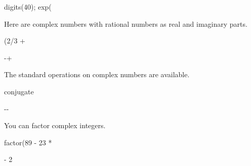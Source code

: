 {{{{{{{{\begin{xtc}
\begin{spadsrc}
digits(40);  exp(%
\end{spadsrc}
\begin{TeXOutput}
\begin{fricasmath}{13}
%
\end{fricasmath}
\end{TeXOutput}
\end{xtc}
\begin{xtc}
\begin{xtccomment}
Here are complex numbers with rational numbers as real and
imaginary parts.
\end{xtccomment}
\begin{spadsrc}
(2/3 + %
\end{spadsrc}
\begin{TeXOutput}
\begin{fricasmath}{14}
-{}+\TIMES \ImaginaryI %
\end{fricasmath}
\end{TeXOutput}
\end{xtc}
\begin{xtc}
\begin{xtccomment}
The standard operations on complex numbers are available.
\end{xtccomment}
\begin{spadsrc}
conjugate %
\end{spadsrc}
\begin{TeXOutput}
\begin{fricasmath}{15}
-{}-{\TIMES \ImaginaryI }%
\end{fricasmath}
\end{TeXOutput}
\end{xtc}
\begin{xtc}
\begin{xtccomment}
You can factor complex integers.
\end{xtccomment}
\begin{spadsrc}
factor(89 - 23 * %
\end{spadsrc}
\begin{TeXOutput}
\begin{fricasmath}{16}
-{\TIMES {}\TIMES \SUPER%
{}{2}}%
\end{fricasmath}
\end{TeXOutput}

\end{xtc}}}}}}}}}
